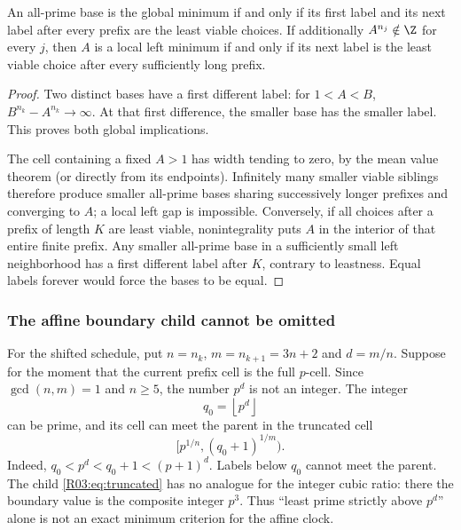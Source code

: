 \documentclass[11pt,a4paper]{article}
\theoremstyle{definition}\newtheorem{definition}[theorem]{Definition}
\theoremstyle{remark}\newtheorem{remark}[theorem]{Remark}
\newcommand{\floor}[1]{\left\lfloor#1\right\rfloor}
\begin{document}
\begin{proposition}\label{R03:prop:viable}
An all-prime base is the global minimum if and only if its first label
and its next label after every prefix are the least viable choices.
If additionally $A^{n_j}\notin\Z$ for every $j$, then $A$ is a local
left minimum if and only if its next label is the least viable choice
after every sufficiently long prefix.
\end{proposition}
\begin{proof}
Two distinct bases have a first different label: for $1<A<B$,
$B^{n_k}-A^{n_k}\to\infty$. At that first difference, the smaller
base has the smaller label. This proves both global implications.

The cell containing a fixed $A>1$ has width tending to zero, by the
mean value theorem (or directly from its endpoints). Infinitely many
smaller viable siblings therefore produce smaller all-prime bases
sharing successively longer prefixes and converging to $A$; a local
left gap is impossible. Conversely, if all choices after a prefix
of length $K$ are least viable, nonintegrality puts $A$ in the
interior of that entire finite prefix. Any smaller all-prime base
in a sufficiently small left neighborhood has a first different
label after $K$, contrary to leastness. Equal labels forever would
force the bases to be equal.
\end{proof}

\subsubsection{The affine boundary child cannot be omitted}

For the shifted schedule, put $n=n_k$, $m=n_{k+1}=3n+2$ and $d=m/n$.
Suppose for the moment that the current prefix cell is the full
$p$-cell. Since $\gcd(n,m)=1$ and $n\ge5$, the number $p^d$ is not
an integer. The integer
\begin{equation}\label{R03:eq:boundary}
 q_0=\floor{p^d}
\end{equation}
can be prime, and its cell can meet the parent in the truncated cell
\begin{equation}\label{R03:eq:truncated}
 [p^{1/n},(q_0+1)^{1/m}).
\end{equation}
Indeed, $q_0<p^d<q_0+1<(p+1)^d$. Labels below $q_0$ cannot meet
the parent. The child \eqref{R03:eq:truncated} has no analogue for the
integer cubic ratio: there the boundary value is the composite
integer $p^3$. Thus ``least prime strictly above $p^d$'' alone is
not an exact minimum criterion for the affine clock.
\end{document}

